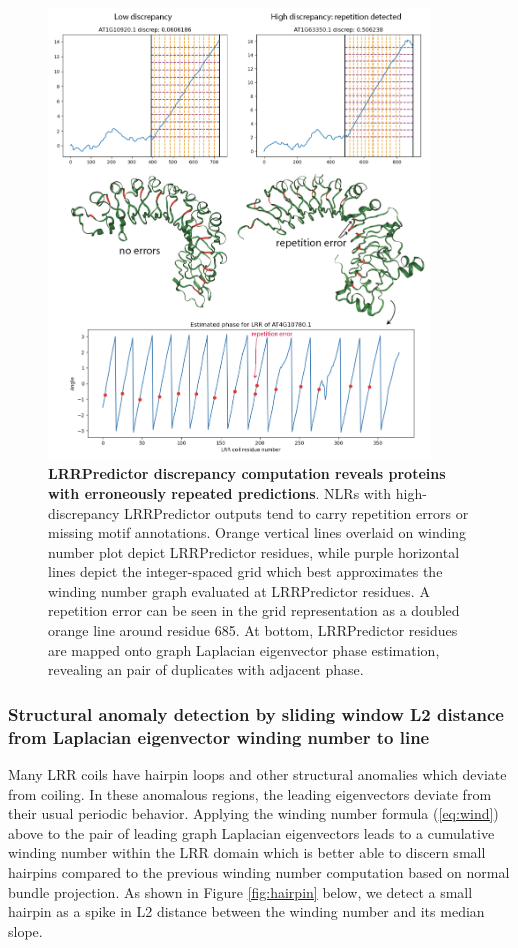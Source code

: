 \documentclass[authoryear]{article}
\begin{document}
\begin{figure}[h!]
 \centering
 \includegraphics[width=0.9\textwidth]{error.png}
 \caption{\textbf{LRRPredictor discrepancy computation reveals proteins with erroneously repeated predictions}. NLRs with high-discrepancy LRRPredictor outputs tend to carry repetition errors or missing motif annotations. Orange vertical lines overlaid on winding number plot depict LRRPredictor residues, while purple horizontal lines depict the integer-spaced grid which best approximates the winding number graph evaluated at LRRPredictor residues. A repetition error can be seen in the grid representation as a doubled orange line around residue 685. At bottom, LRRPredictor residues are mapped onto graph Laplacian eigenvector phase estimation, revealing an pair of duplicates with adjacent phase.}
 \label{fig:lrrpred_grid}
\end{figure}


\subsubsection*{Structural anomaly detection by sliding window L2 distance from Laplacian eigenvector winding number to line}

Many LRR coils have hairpin loops and other structural anomalies which deviate from coiling. In these anomalous regions, the leading eigenvectors deviate from their usual periodic behavior. Applying the winding number formula (\ref{eq:wind}) above to the pair of leading graph Laplacian eigenvectors leads to a cumulative winding number within the LRR domain which is better able to discern small hairpins compared to the previous winding number computation based on normal bundle projection. As shown in Figure \ref{fig:hairpin} below, we detect a small hairpin as a spike in L2 distance between the winding number and its median slope.
\end{document}
